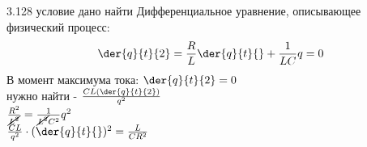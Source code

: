 \testCom
{%
	3.128
}
{%
	условие
}
{%
	дано
}
{%
	найти
}
{%
	Дифференциальное уравнение, описывающее физический процесс:\\
	\[ \der{q}{t}{2} = \frac{R}{L} \der{q}{t}{} + \frac{1}{LC} q = 0\]
	В момент максимума тока: $ \der{q}{t}{2} = 0$\\
	нужно найти - $\frac{CL ( \der{q}{t}{2})}{q^2}$\\
	$\frac{R^2}{\cancel{L^2}} = \frac{1}{\cancel{L^2} C^2} q^2$\\
	$\frac{CL}{q^2} \cdot ( \der{q}{t}{})^2 = \frac{L}{CR^2}$\\
}

